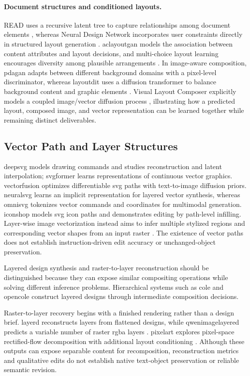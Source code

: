 \paragraph{Document structures and conditioned layouts.}
READ uses a recursive latent tree to capture relationships among document elements \citep{read2020}, whereas Neural Design Network incorporates user constraints directly in structured layout generation \citep{ndn2020}.
\ac{aclayoutgan} models the association between content attributes and layout decisions, and multi-choice layout learning encourages diversity among plausible arrangements \citep{layoutmcl2023}.
In image-aware composition, \ac{pdagan} adapts between different background domains with a pixel-level discriminator, whereas \ac{layoutdit} uses a diffusion transformer to balance background content and graphic elements \citep{layoutdit2024}.
Visual Layout Composer explicitly models a coupled image/vector diffusion process \citep{vlc2024}, illustrating how a predicted layout, composed image, and vector representation can be learned together while remaining distinct deliverables.

\subsection{Vector Path and Layer Structures}
\ac{deepsvg} models drawing commands and studies reconstruction and latent interpolation; \ac{svgformer} learns representations of continuous vector graphics.
\ac{vectorfusion} optimizes differentiable \ac{svg} paths with text-to-image diffusion priors.
\ac{neuralsvg} learns an implicit representation for layered vector synthesis, whereas \ac{omnisvg} tokenizes vector commands and coordinates for multimodal generation.
\ac{iconshop} models \ac{svg} icon paths and demonstrates editing by path-level infilling.
Layer-wise image vectorization instead aims to infer multiple stylized regions and corresponding vector shapes from an input raster \citep{live2022}.
The existence of vector paths does not establish instruction-driven edit accuracy or unchanged-object preservation.

Layered design synthesis and raster-to-layer reconstruction should be distinguished because they can expose similar compositing operations while solving different inference problems.
Hierarchical systems such as \ac{cole} and \ac{opencole} construct layered designs through intermediate composition decisions.

Raster-to-layer recovery begins with a finished rendering rather than a design brief.
\ac{layerd} reconstructs layers from flattened designs, while \ac{qwenimagelayered} predicts a variable number of raster \ac{rgba} layers \citep{layerd2025,qwenimagelayered2026}.
\ac{pixelart} explores pixel-space rectified-flow decomposition with additional layout conditioning \citep{jia2026pixelart}.
Although these outputs can expose separable content for recomposition, reconstruction metrics and qualitative edits do not establish native text-object preservation or reliable semantic revision.

